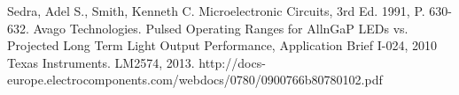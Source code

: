 \begin{thebibliography}{11}
		Sedra, Adel S., Smith, Kenneth C. Microelectronic Circuits, 3rd Ed. 1991, P. 630-632.
		Avago Technologies. Pulsed Operating Ranges for AllnGaP LEDs vs. Projected Long Term Light Output Performance, Application Brief I-024, 2010
		Texas Instruments. LM2574, 2013. http://docs-europe.electrocomponents.com/webdocs/0780/0900766b80780102.pdf
\end{thebibliography}